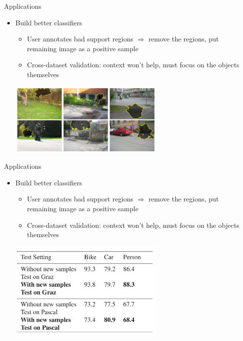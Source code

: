 \documentclass[12pt]{beamer}
\begin{document}
\begin{frame}{Applications}
    \begin{itemize}
        \item Build better classifiers
        \begin{itemize}
            \item User annotates bad support regions $\Rightarrow$ remove the regions, put remaining image as a positive sample
            \item Cross-dataset validation: context won't help, must focus on the objects themselves
        \end{itemize}
        \includegraphics[width=0.6\textwidth]{fig6.png} \\
    \end{itemize}
\end{frame}

\begin{frame}{Applications}
    \begin{itemize}
        \item Build better classifiers
        \begin{itemize}
            \item User annotates bad support regions $\Rightarrow$ remove the regions, put remaining image as a positive sample
            \item Cross-dataset validation: context won't help, must focus on the objects themselves
        \end{itemize}
        \includegraphics[width=0.6\textwidth]{tbl1.png} \\
    \end{itemize}
\end{frame}
\end{document}
